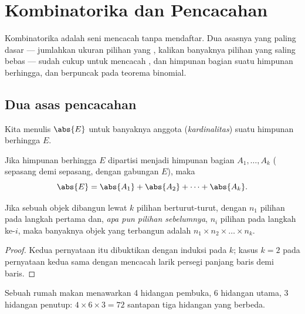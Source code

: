 \chapter{Kombinatorika dan Pencacahan}\label{ch:g12:comb}

Kombinatorika adalah seni mencacah tanpa mendaftar. Dua asasnya yang paling
dasar --- jumlahkan ukuran pilihan yang , kalikan banyaknya
pilihan yang saling bebas --- sudah cukup untuk mencacah , 
dan himpunan bagian suatu himpunan berhingga, dan berpuncak pada teorema binomial.

\section{Dua asas pencacahan}

Kita menulis $\abs{E}$ untuk banyaknya anggota (\emph{kardinalitas}) suatu
himpunan berhingga $E$.

\begin{proposition}\label{prop:g12:comb:addition}
Jika himpunan berhingga $E$ dipartisi menjadi himpunan bagian $A_1, \dots, A_k$
( sepasang demi sepasang, dengan gabungan $E$), maka
\[
\abs{E} = \abs{A_1} + \abs{A_2} + \dots + \abs{A_k}.
\]
\end{proposition}

\begin{proposition}\label{prop:g12:comb:multiplication}
Jika sebuah objek dibangun lewat $k$ pilihan berturut-turut, dengan $n_1$ pilihan
pada langkah pertama dan, \emph{apa pun pilihan sebelumnya}, $n_i$ pilihan pada
langkah ke-$i$, maka banyaknya objek yang terbangun adalah
$n_1 \times n_2 \times \dots \times n_k$.
\end{proposition}

\begin{proof}
Kedua pernyataan itu dibuktikan dengan induksi pada $k$; kasus $k = 2$ pada
pernyataan kedua sama dengan mencacah larik persegi panjang baris demi baris.
\end{proof}

\begin{example}
Sebuah rumah makan menawarkan 4 hidangan pembuka, 6 hidangan utama, 3 hidangan
penutup: $4 \times 6 \times 3 = 72$ santapan tiga hidangan yang berbeda.
\end{example}

